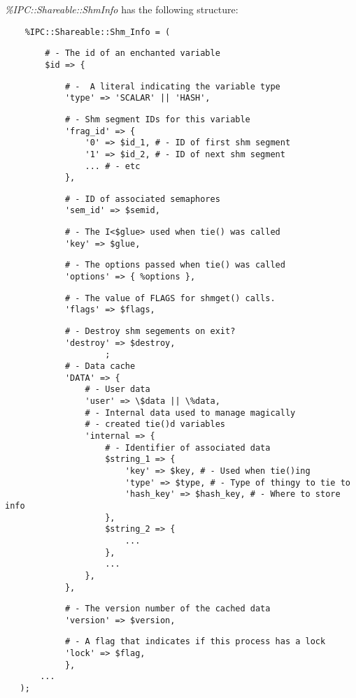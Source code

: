 {\em \%IPC::Shareable::Shm\underscore{}Info\/} has the following structure:
\begin{verbatim}
    %IPC::Shareable::Shm_Info = (
\end{verbatim}
\begin{verbatim}
        # - The id of an enchanted variable
        $id => {
\end{verbatim}
\begin{verbatim}
            # -  A literal indicating the variable type
            'type' => 'SCALAR' || 'HASH',
\end{verbatim}
\begin{verbatim}
            # - Shm segment IDs for this variable
            'frag_id' => {
                '0' => $id_1, # - ID of first shm segment
                '1' => $id_2, # - ID of next shm segment
                ... # - etc
            },
\end{verbatim}
\begin{verbatim}
            # - ID of associated semaphores
            'sem_id' => $semid,
\end{verbatim}
\begin{verbatim}
            # - The I<$glue> used when tie() was called
            'key' => $glue,
\end{verbatim}
\begin{verbatim}
            # - The options passed when tie() was called
            'options' => { %options },
\end{verbatim}
\begin{verbatim}
            # - The value of FLAGS for shmget() calls.
            'flags' => $flags,
\end{verbatim}
\begin{verbatim}
            # - Destroy shm segements on exit?
            'destroy' => $destroy,
                    ;
            # - Data cache
            'DATA' => {
                # - User data
                'user' => \$data || \%data,
                # - Internal data used to manage magically
                # - created tie()d variables
                'internal => {
                    # - Identifier of associated data
                    $string_1 => {
                        'key' => $key, # - Used when tie()ing
                        'type' => $type, # - Type of thingy to tie to
                        'hash_key' => $hash_key, # - Where to store info
                    },
                    $string_2 => {
                        ...
                    },
                    ...
                },
            },
\end{verbatim}
\begin{verbatim}
            # - The version number of the cached data
            'version' => $version,
\end{verbatim}
\begin{verbatim}
            # - A flag that indicates if this process has a lock
            'lock' => $flag,
            },
       ...
   );
\end{verbatim}

